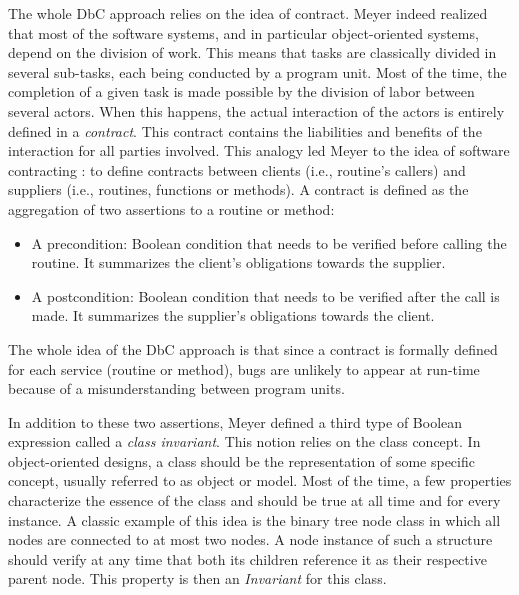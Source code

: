 The whole DbC approach relies on the idea of contract. Meyer indeed realized that most of the software systems, and in particular object-oriented systems, depend on the division of work. This means that tasks are classically divided in several sub-tasks, each being conducted by a program unit. 
Most of the time, the completion of a given task is made possible by the division of labor between several actors. When this happens, the actual interaction of the actors is entirely defined in a \emph{contract}. This contract contains the liabilities and benefits of the interaction for all parties involved. This analogy led Meyer to the idea of software contracting \cite{meyer1992applying}: to define contracts between clients (i.e., routine’s callers) and suppliers (i.e., routines, functions or methods).
A contract is defined as the aggregation of two assertions to a routine or method:
\begin{itemize}
    \item A precondition:  Boolean condition that needs to be verified before calling the routine. It summarizes the client's obligations towards the supplier.
    \item A postcondition: Boolean condition that needs to be verified after the call is made. It summarizes the supplier's obligations towards the client.
\end{itemize}

The whole idea of the DbC approach is that since a contract is formally defined for each service (routine or method), bugs are unlikely to appear at run-time because of a misunderstanding between program units.

In addition to these two assertions, Meyer defined a third type of Boolean expression called a \textit{class invariant}. This notion relies on the class concept. In object-oriented designs, a class should be the representation of some specific concept, usually referred to as object or model. Most of the time, a few properties characterize the essence of the class and should be true at all time and for every instance. A classic example of this idea is the binary tree node class in which all nodes are connected to at most two nodes. A node instance of such a structure should verify at any time that both its children reference it as their respective parent node. This property is then an \textit{Invariant} for this class.